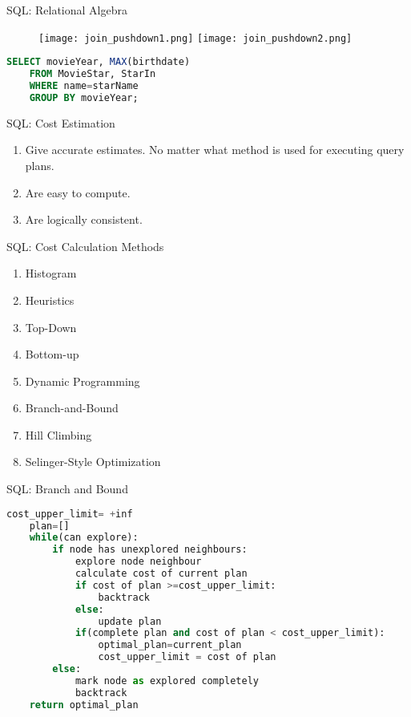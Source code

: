 \begin{frame}[fragile]{SQL: Relational Algebra}
    \begin{figure}
        \centering
        \texttt{[image: join\_pushdown1.png]}
        \texttt{[image: join\_pushdown2.png]}
        \label{fig:j_1}
    \end{figure}
    \begin{lstlisting}[language=SQL]
    SELECT movieYear, MAX(birthdate) 
    FROM MovieStar, StarIn
    WHERE name=starName 
    GROUP BY movieYear;
    \end{lstlisting}
\end{frame}

\begin{frame}{SQL: Cost Estimation}
    \begin{enumerate}
        \item Give accurate estimates. No matter what method is used for executing query plans.
        \item Are easy to compute.
        \item Are logically consistent.
    \end{enumerate}
\end{frame}

\begin{frame}{SQL: Cost Calculation Methods}
    \begin{enumerate}
        \item Histogram
        \item Heuristics
        \item Top-Down
        \item Bottom-up
        \item Dynamic Programming
        \item Branch-and-Bound
        \item Hill Climbing
        \item Selinger-Style Optimization
    \end{enumerate}
\end{frame}

\begin{frame}[fragile]{SQL: Branch and Bound}
    \begin{lstlisting}[language=python]
    cost_upper_limit= +inf
    plan=[]
    while(can explore):
        if node has unexplored neighbours:
            explore node neighbour
            calculate cost of current plan
            if cost of plan >=cost_upper_limit:
                backtrack
            else:
                update plan
            if(complete plan and cost of plan < cost_upper_limit):
                optimal_plan=current_plan
                cost_upper_limit = cost of plan
        else:
            mark node as explored completely
            backtrack
    return optimal_plan
    \end{lstlisting}
\end{frame}

